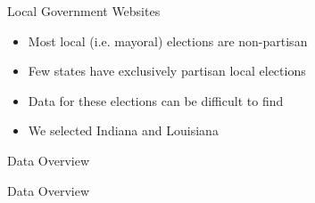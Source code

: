 \documentclass[12pt]{beamer}
\begin{document}
\begin{frame}{Local Government Websites}
\linespread{1.5}
{\large
	\begin{itemize}
		\item Most local (i.e. mayoral) elections are non-partisan
		\item Few states have exclusively partisan local elections
		\item Data for these elections can be difficult to find
		\item We selected Indiana and Louisiana
	\end{itemize}
	
	}
\end{frame}

\begin{frame}{Data Overview}
\begin{figure}
	\hfill
	\hfill
\end{figure}
\end{frame}

\begin{frame}{Data Overview}


\end{frame}
\end{document}
